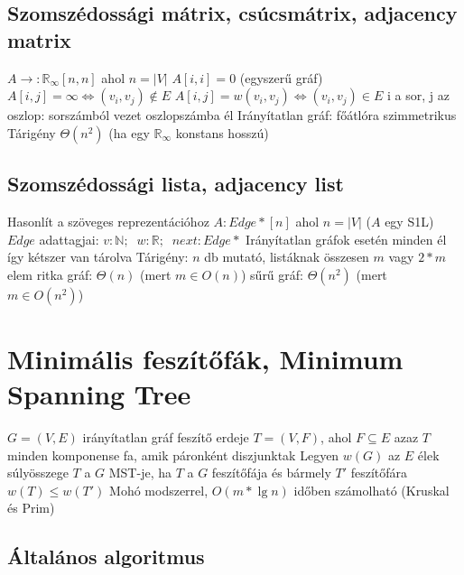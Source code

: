 \documentclass[12pt,a4paper]{article}
\begin{document}
\pagebreak

\subsection{Szomszédossági mátrix, csúcsmátrix, adjacency matrix}

\begin{outline}
	\1 $A\rightarrow : \mathbb{R}_\infty[n,n]$ ahol $n=|V|$
		\2 $A[i,i] = 0$ (egyszerű gráf)
		\2 $A[i,j] = \infty \Leftrightarrow (v_i,v_j) \notin E$
		\2 $A[i,j] = w(v_i,v_j) \Leftrightarrow (v_i,v_j) \in E$
		\2 i a sor, j az oszlop: sorszámból vezet oszlopszámba él
	\1 Irányítatlan gráf: főátlóra szimmetrikus
	\1 Tárigény $\Theta(n^2)$ (ha egy $\mathbb{R}_\infty$ konstans hosszú)
\end{outline}

\subsection{Szomszédossági lista, adjacency list}

\begin{outline}
	\1 Hasonlít a szöveges reprezentációhoz
	\1 $A:Edge*[n]$ ahol $n=|V|$ ($A$ egy S1L)
		\2 $Edge$ adattagjai: $v:\mathbb{N}; \;\; w:\mathbb{R}; \;\; next:Edge*$
	\1 Irányítatlan gráfok esetén minden él így kétszer van tárolva
	\1 Tárigény: $n$ db mutató, listáknak összesen $m$ vagy $2 * m$ elem
		\2 ritka gráf: $\Theta(n)$ (mert $m \in O(n)$)
		\2 sűrű gráf: $\Theta(n^2)$ (mert $m \in O(n^2)$)
\end{outline}

\pagebreak

\section{Minimális feszítőfák, Minimum Spanning Tree}

\begin{outline}
	\1 $G=(V,E)$ irányítatlan gráf feszítő erdeje $T=(V,F)$, ahol $F \subseteq E$
		\2 azaz $T$ minden komponense fa, amik páronként diszjunktak
	\1 Legyen $w(G)$ az $E$ élek súlyösszege
		\2 $T$ a $G$ MST-je, ha $T$ a $G$ feszítőfája és bármely $T'$ feszítőfára $w(T) \le w(T')$
	\1 Mohó modszerrel, $O(m*\lg n)$ időben számolható (Kruskal és Prim)
\end{outline}

\subsection{Általános algoritmus}
\end{document}
